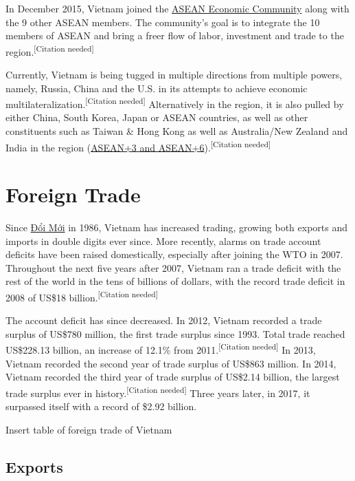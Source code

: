 \documentclass[openany]{book}
\begin{document}
In December 2015, Vietnam joined the \href{https://en.wikipedia.org/wiki/ASEAN_Economic_Community}{ASEAN Economic Community} along with the 9 other ASEAN members. The community's goal is to integrate the 10 members of ASEAN and bring a freer flow of labor, investment and trade to the region.\textsuperscript{[Citation needed]}

Currently, Vietnam is being tugged in multiple directions from multiple powers, namely, Russia, China and the U.S. in its attempts to achieve economic multilateralization.\textsuperscript{[Citation needed]} Alternatively in the region, it is also pulled by either China, South Korea, Japan or ASEAN countries, as well as other constituents such as Taiwan \& Hong Kong as well as Australia/New Zealand and India in the region (\href{https://en.wikipedia.org/wiki/ASEAN#Relations_with_other_blocs}{ASEAN+3 and ASEAN+6}).\textsuperscript{[Citation needed]}

\section{Foreign Trade}
Since \href{https://en.wikipedia.org/wiki/%C4%90%E1%BB%95i_M%E1%BB%9Bi}{Đổi Mới} in 1986, Vietnam has increased trading, growing both exports and imports in double digits ever since. More recently, alarms on trade account deficits have been raised domestically, especially after joining the WTO in 2007. Throughout the next five years after 2007, Vietnam ran a trade deficit with the rest of the world in the tens of billions of dollars, with the record trade deficit in 2008 of US\$18 billion.\textsuperscript{[Citation needed]}

The account deficit has since decreased. In 2012, Vietnam recorded a trade surplus of US\$780 million, the first trade surplus since 1993. Total trade reached US\$228.13 billion, an increase of 12.1\% from 2011.\textsuperscript{[Citation needed]} In 2013, Vietnam recorded the second year of trade surplus of US\$863 million. In 2014, Vietnam recorded the third year of trade surplus of US\$2.14 billion, the largest trade surplus ever in history.\textsuperscript{[Citation needed]} Three years later, in 2017, it surpassed itself with a record of \$2.92 billion.

\begin{table}[h]
    \centering
    Insert table of foreign trade of Vietnam
    \caption*{Table 7.1}
\end{table}

\subsection{Exports}
\end{document}
